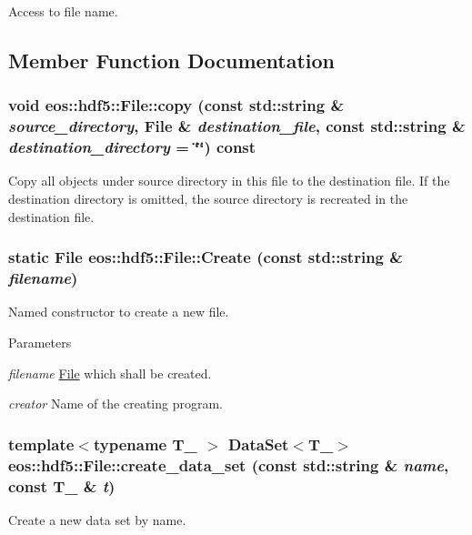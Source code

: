 Access to file name. 

\subsection{Member Function Documentation}
\hypertarget{classeos_1_1hdf5_1_1File_a1b00da32195932e27c8d88081f9f493c}{
\subsubsection[{copy}]{\setlength{\rightskip}{0pt plus 5cm}void eos::hdf5::File::copy (const std::string \& {\em source\_\-directory}, \/  {\bf File} \& {\em destination\_\-file}, \/  const std::string \& {\em destination\_\-directory} = {\ttfamily \char`\"{}\char`\"{}}) const}}
\label{classeos_1_1hdf5_1_1File_a1b00da32195932e27c8d88081f9f493c}
Copy all objects under source directory in this file to the destination file. If the destination directory is omitted, the source directory is recreated in the destination file. \hypertarget{classeos_1_1hdf5_1_1File_ad1d6eb1ed34bc9bf83ce564618e1d346}{
\subsubsection[{Create}]{\setlength{\rightskip}{0pt plus 5cm}static {\bf File} eos::hdf5::File::Create (const std::string \& {\em filename})}}
\label{classeos_1_1hdf5_1_1File_ad1d6eb1ed34bc9bf83ce564618e1d346}
Named constructor to create a new file.


\begin{DoxyParams}{Parameters}
\item[{\em filename}]\hyperlink{classeos_1_1hdf5_1_1File}{File} which shall be created. \item[{\em creator}]Name of the creating program. \end{DoxyParams}
\hypertarget{classeos_1_1hdf5_1_1File_a6ae5be7fa9d26030daee1e3631a0432f}{
\subsubsection[{create\_\-data\_\-set}]{\setlength{\rightskip}{0pt plus 5cm}template$<$typename T\_\- $>$ {\bf DataSet}$<$T\_\-$>$ eos::hdf5::File::create\_\-data\_\-set (const std::string \& {\em name}, \/  const T\_\- \& {\em t})}}
\label{classeos_1_1hdf5_1_1File_a6ae5be7fa9d26030daee1e3631a0432f}
Create a new data set by name.



